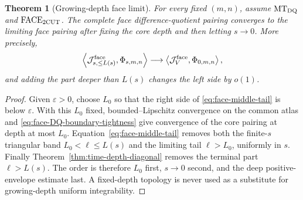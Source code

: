 \documentclass[11pt]{article}
\newtheorem{theorem}{Theorem}[section]
\begin{document}
\begin{theorem}[Growing-depth face limit]
\label{thm:face-two-cutoff}
For every fixed $(m,n)$, assume $\mathrm{MT}_{\rm DQ}$ and
$\mathrm{FACE}_{\rm 2CUT}$.  The complete face difference-quotient pairing
converges to the limiting face pairing after fixing the core depth and then
letting $s\to0$.  More precisely,
\begin{equation}
\label{eq:face-growing-depth-convergence}
 \left\langle\mathcal J_{s,\le L(s)}^{\rm face},
       \Phi_{s,m,n}\right\rangle
 \longrightarrow
 \left\langle\mathcal J_{V}^{\rm face},
       \Phi_{0,m,n}\right\rangle,
\end{equation}
and adding the part deeper than $L(s)$ changes the left side by $o(1)$.
\end{theorem}

\begin{proof}
Given $\varepsilon>0$, choose $L_0$ so that the right side of
\eqref{eq:face-middle-tail} is below $\varepsilon$.  With this $L_0$ fixed,
bounded--Lipschitz convergence on the common atlas and
\eqref{eq:face-DQ-boundary-tightness} give convergence of the core pairing
at depth at most $L_0$.  Equation~\eqref{eq:face-middle-tail} removes both
the finite-$s$ triangular band $L_0<\ell\le L(s)$ and the limiting tail
$\ell>L_0$, uniformly in $s$.  Finally
Theorem~\ref{thm:time-depth-diagonal} removes the terminal part
$\ell>L(s)$.  The order is therefore $L_0$ first, $s\to0$ second, and the
deep positive-envelope estimate last.  A fixed-depth topology is never used
as a substitute for growing-depth uniform integrability.
\end{proof}
\end{document}
